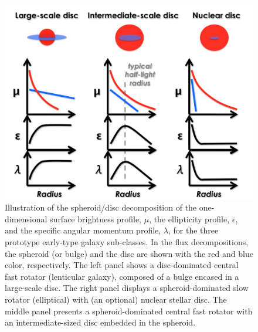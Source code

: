 \documentclass[useAMS,usenatbib,article]{mnras}
\begin{document}
\begin{figure}
\begin{center}
\includegraphics[width=\columnwidth]{discmodel.pdf}
\caption{Illustration of the spheroid/disc decomposition of the one-dimensional surface brightness profile, $\mu$, 
the ellipticity profile, $\epsilon$, and the specific angular momentum profile, $\lambda$,
for the three prototype early-type galaxy sub-classes. 
In the flux decompositions, the spheroid (or bulge) and the disc are shown with the red and blue color, respectively. 
The left panel shows a disc-dominated central fast rotator (lenticular galaxy), composed of a bulge encased in a large-scale disc. 
The right panel displays a spheroid-dominated slow rotator (elliptical) with (an optional) nuclear stellar disc. 
The middle panel presents a spheroid-dominated central fast rotator with an intermediate-sized disc embedded in the spheroid. }
\label{fig:model}
\end{center}
\end{figure}
\end{document}

